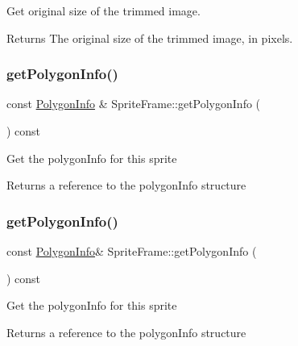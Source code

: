Get original size of the trimmed image.

\begin{DoxyReturn}{Returns}
The original size of the trimmed image, in pixels. 
\end{DoxyReturn}
\mbox{\label{classSpriteFrame_a5fe06786a2638e9d38adde54fb34d4a4}} 
\subsubsection{\texorpdfstring{get\+Polygon\+Info()}{getPolygonInfo()}\hspace{0.1cm}{\footnotesize\ttfamily [1/2]}}
{\footnotesize\ttfamily const \hyperlink{classPolygonInfo}{Polygon\+Info} \& Sprite\+Frame\+::get\+Polygon\+Info (\begin{DoxyParamCaption}{ }\end{DoxyParamCaption}) const}

Get the polygon\+Info for this sprite

\begin{DoxyReturn}{Returns}
a reference to the polygon\+Info structure 
\end{DoxyReturn}
\mbox{\label{classSpriteFrame_a013f292263cbefc030e62e43bd22bc29}} 
\subsubsection{\texorpdfstring{get\+Polygon\+Info()}{getPolygonInfo()}\hspace{0.1cm}{\footnotesize\ttfamily [2/2]}}
{\footnotesize\ttfamily const \hyperlink{classPolygonInfo}{Polygon\+Info}\& Sprite\+Frame\+::get\+Polygon\+Info (\begin{DoxyParamCaption}{ }\end{DoxyParamCaption}) const}

Get the polygon\+Info for this sprite

\begin{DoxyReturn}{Returns}
a reference to the polygon\+Info structure 
\end{DoxyReturn}
\mbox{\label{classSpriteFrame_a7caab90d4ee888a3260f36c52146ca6d}} 
